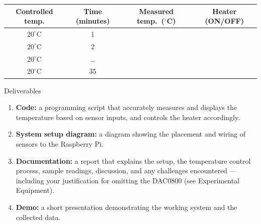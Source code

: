 \begin{procedure}
  \needspace{4cm}
  \begin{boxedtable}
    \label{tab:exp8rpi-results}
    \centering
    \begin{tabular}{cccc}
      \toprule
      Controlled temp. & Time (minutes) & Measured temp.\ ($^\circ$C) & Heater (ON/OFF) \\
      \midrule
      $20^\circ$C      & 1              &                             &                 \\
      $20^\circ$C      & 2              &                             &                 \\
      $20^\circ$C      & \ldots         &                             &                 \\
      $20^\circ$C      & 35             &                             &                 \\
      \bottomrule
    \end{tabular}
  \end{boxedtable}
\end{procedure}

\begin{labsection}{Deliverables}
  \begin{enumerate}
    \item \textbf{Code:} a programming script that accurately measures and displays the temperature based on sensor inputs, and controls the heater accordingly.
    \item \textbf{System setup diagram:} a diagram showing the placement and wiring of sensors to the Raspberry Pi.
    \item \textbf{Documentation:} a report that explains the setup, the temperature control process, sample readings, discussion, and any challenges encountered --- including your justification for omitting the DAC0800 (see Experimental Equipment).
    \item \textbf{Demo:} a short presentation demonstrating the working system and the collected data.
  \end{enumerate}
\end{labsection}
\newpage

